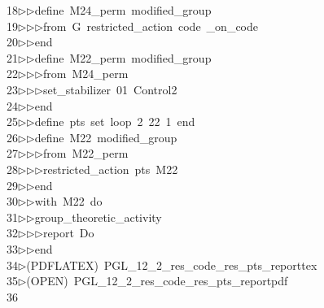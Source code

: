 \begin{tabbing}
18\>$\triangleright$\>$\triangleright$\>define\ M24\_perm\ modified\_group\ \\[0pt]
19\>$\triangleright$\>$\triangleright$\>$\triangleright$\>from\ G\ restricted\_action\ code\ \_on\_code\ \\[0pt]
20\>$\triangleright$\>$\triangleright$\>end\ \\[0pt]
21\>$\triangleright$\>$\triangleright$\>define\ M22\_perm\ modified\_group\ \\[0pt]
22\>$\triangleright$\>$\triangleright$\>$\triangleright$\>from\ M24\_perm\ \\[0pt]
23\>$\triangleright$\>$\triangleright$\>$\triangleright$\>set\_stabilizer\ 01\ Control2\ \\[0pt]
24\>$\triangleright$\>$\triangleright$\>end\ \\[0pt]
25\>$\triangleright$\>$\triangleright$\>define\ pts\ set\ loop\ 2\ 22\ 1\ end\ \\[0pt]
26\>$\triangleright$\>$\triangleright$\>define\ M22\ modified\_group\ \\[0pt]
27\>$\triangleright$\>$\triangleright$\>$\triangleright$\>from\ M22\_perm\ \\[0pt]
28\>$\triangleright$\>$\triangleright$\>$\triangleright$\>restricted\_action\ pts\ M22\ \\[0pt]
29\>$\triangleright$\>$\triangleright$\>end\ \\[0pt]
30\>$\triangleright$\>$\triangleright$\>with\ M22\ do\ \\[0pt]
31\>$\triangleright$\>$\triangleright$\>group\_theoretic\_activity\ \\[0pt]
32\>$\triangleright$\>$\triangleright$\>$\triangleright$\>report\ Do\ \\[0pt]
33\>$\triangleright$\>$\triangleright$\>end\\[0pt]
34\>$\triangleright$\>(PDFLATEX)\ PGL\_12\_2\_res\_code\_res\_pts\_reporttex\\[0pt]
35\>$\triangleright$\>(OPEN)\ PGL\_12\_2\_res\_code\_res\_pts\_reportpdf\\[0pt]
36\>\end{tabbing}
